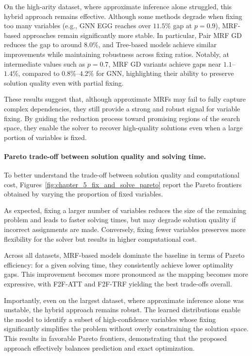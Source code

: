 On the high-arity dataset, where approximate inference alone struggled, this hybrid approach remains effective. Although some methods degrade when fixing too many variables (e.g., GNN EGG reaches over $11.5\%$ gap at $p=0.9$), MRF-based approaches remain significantly more stable. In particular, Pair MRF GD reduces the gap to around $8.0\%$, and Tree-based models achieve similar improvements while maintaining robustness across fixing ratios. Notably, at intermediate values such as $p=0.7$, MRF GD variants achieve gaps near $1.1$--$1.4\%$, compared to $0.8\%$--$4.2\%$ for GNN, highlighting their ability to preserve solution quality even with partial fixing.

These results suggest that, although approximate MRFs may fail to fully capture complex dependencies, they still provide a strong and robust signal for variable fixing. By guiding the reduction process toward promising regions of the search space, they enable the solver to recover high-quality solutions even when a large portion of variables is fixed.




\paragraph{Pareto trade-off between solution quality and solving time.}

To better understand the trade-off between solution quality and computational cost, Figures~\ref{fig:chapter_5_fix_and_solve_pareto} report the Pareto frontiers obtained by varying the proportion of fixed variables.

As expected, fixing a larger number of variables reduces the size of the remaining problem and leads to faster solving times, but may degrade solution quality if incorrect assignments are made. Conversely, fixing fewer variables preserves more flexibility for the solver but results in higher computational cost.

Across all datasets, MRF-based models dominate the baseline in terms of Pareto efficiency: for a given solving time, they consistently achieve lower optimality gaps. This improvement becomes more pronounced as the mapping becomes more expressive, with F2F-ATT and F2F-TRF yielding the best trade-offs overall.

Importantly, even on the largest dataset, where approximate inference alone was unstable, the hybrid approach remains robust. The learned distributions enable the model to identify a subset of high-confidence variables whose fixing significantly simplifies the problem without overly constraining the solution space. This results in favorable Pareto frontiers, demonstrating that the proposed approach effectively balances prediction and exact optimization.

